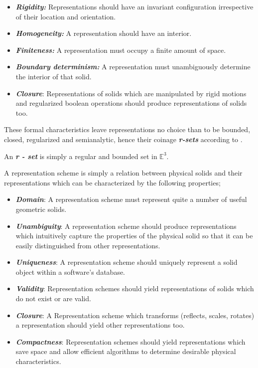 \begin{itemize}
\item \textit{\textbf{Rigidity:}} Representations should have an invariant configuration
irrespective of their location and orientation.
\item \textit{\textbf{Homogeneity:}} A representation should have an interior.
\item \textit{\textbf{Finiteness:}} A representation must occupy a finite amount of space.
\item \textit{\textbf{Boundary   determinism:}} A representation must unambiguously determine
the interior of that solid.
\item \textit{\textbf{Closure}}: Representations of solids which are manipulated by rigid
motions and regularized boolean operations should produce representations of solids too.
\end{itemize}
These formal characteristics leave representations no choice than to be
bounded, closed, regularized and semi­analytic, hence their coinage \textit{\textbf{r-­sets}}
according to \cite{5}. 
\begin{Def2}
An \textit{\textbf{r - ­set}} is simply a regular and bounded set in $\mathbb{E}^3$.
\end{Def2}
\hspace{30} A representation scheme is simply a relation between physical solids and their representations which can be characterized by the following properties;
\begin{itemize}
\item \textit{\textbf{Domain}}: A representation scheme must represent quite a number of useful geometric solids. 
\item \textit{\textbf{Unambiguity}}: A representation scheme should produce representations which intuitively capture the properties of the physical solid so that it can be easily distinguished from other representations.
\item \textit{\textbf{Uniqueness}}: A representation scheme should uniquely represent a solid object within a software's database.  
\item \textit{\textbf{Validity}}: Representation schemes should yield representations of solids which do not exist or are valid.  
\item \textit{\textbf{Closure}}: A Representation scheme which transforms (reflects, scales, rotates) a representation should yield other representations too.
\item \textit{\textbf{Compactness}}: Representation schemes should yield representations which save space and allow efficient algorithms to   determine desirable physical characteristics.
\end{itemize}
